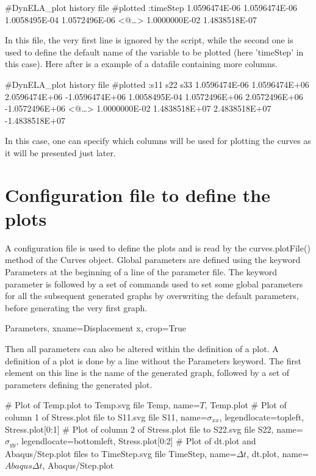 \begin{PythonListing}
#DynELA_plot history file
#plotted :timeStep
1.0596474E-06 1.0596474E-06
1.0058495E-04 1.0572496E-06
<@\ldots\ldots@>
1.0000000E-02 1.4838518E-07
\end{PythonListing}

In this file, the very first line is ignored by the script, while the second one is used to define the default name of the variable to be plotted (here 'timeStep' in this case). Here after is a example of a datafile containing more columns.

\begin{PythonListing}
#DynELA_plot history file
#plotted :s11 s22 s33
1.0596474E-06 1.0596474E+06 2.0596474E+06 -1.0596474E+06
1.0058495E-04 1.0572496E+06 2.0572496E+06 -1.0572496E+06
<@\ldots\ldots@>
1.0000000E-02 1.4838518E+07 2.4838518E+07 -1.4838518E+07
\end{PythonListing}

In this case, one can specify which columns will be used for plotting the curves as it will be presented just later.

\section{Configuration file to define the plots}

A configuration file is used to define the plots and is read by the \textsf{curves.plotFile()} method of the Curves object. Global parameters are defined using the keyword \textsf{Parameters} at the beginning of a line of the parameter file. The keyword parameter is followed by a set of commands used to set some global parameters for all the subsequent generated graphs by overwriting the default parameters, before generating the very first graph.

\begin{PythonListing}
Parameters, xname=Displacement x, crop=True
\end{PythonListing}

Then all parameters can also be altered within the definition of a plot. A definition of a plot is done by a line without the \textsf{Parameters} keyword. The first element on this line is the name of the generated graph, followed by a set of parameters defining the generated plot.

\begin{PythonListing}
# Plot of Temp.plot to Temp.svg file
Temp, name=$T$, Temp.plot
# Plot of column 1 of Stress.plot file to S11.svg file
S11, name=$\sigma_{xx}$, legendlocate=topleft, Stress.plot[0:1]
# Plot of column 2 of Stress.plot file to S22.svg file
S22, name=$\sigma_{yy}$, legendlocate=bottomleft, Stress.plot[0:2]
# Plot of dt.plot and Abaqus/Step.plot files to TimeStep.svg file
TimeStep, name=$\Delta t$, dt.plot, name=$Abaqus \Delta t$, Abaqus/Step.plot
\end{PythonListing}

